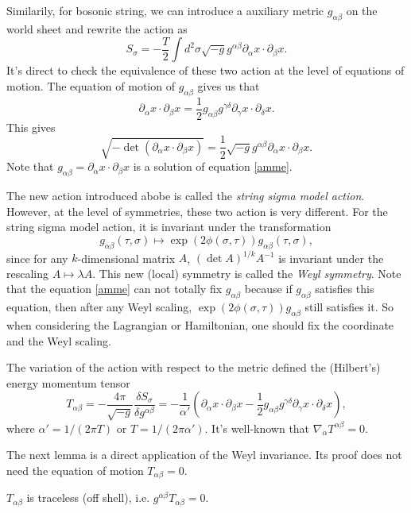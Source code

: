 Similarily, for bosonic string, we can introduce a auxiliary metric 
$g_{\alpha\beta}$ on the world sheet and rewrite the action as
\[
	S_\sigma=-\frac{T}{2} \int d^2\sigma \sqrt{-g}
	g^{\alpha\beta}\partial_\alpha x\cdot \partial_\beta x.
\]
It's direct to check the equivalence of these two action
at the level of equations of motion. The equation of motion of
$g_{\alpha\beta}$ gives us that
\begin{equation}\label{amme}
	\partial_\alpha x\cdot \partial_\beta x
	=\frac{1}{2}g_{\alpha\beta}g^{\gamma\delta}
	\partial_\gamma x\cdot \partial_\delta x.
\end{equation}
This gives
\[
	\sqrt{-\det(\partial_\alpha x\cdot \partial_\beta x)}
	=\frac{1}{2}\sqrt{-g}g^{\alpha\beta}
	\partial_\alpha x\cdot \partial_\beta x.
\]
Note that $g_{\alpha\beta}=\partial_\alpha x\cdot \partial_\beta x$
is a solution of equation \eqref{amme}.

The new action introduced abobe is called 
the \textit{string sigma model action}. However,
at the level of symmetries, these two action is very different.
For the string sigma model action, it is invariant under the 
transformation 
\[
	g_{\alpha\beta}(\tau,\sigma)\longmapsto
	\exp(2\phi(\sigma,\tau))g_{\alpha\beta}(\tau,\sigma),
\]
since for any $k$-dimensional matrix $A$, 
$(\det A)^{1/k} A^{-1}$ is invariant under the rescaling 
$A\mapsto \lambda A$. This new (local) symmetry is called 
the \textit{Weyl symmetry}. Note that the equation 
\eqref{amme} can not totally fix $g_{\alpha\beta}$ because
if $g_{\alpha\beta}$ satisfies this equation, then after
any Weyl scaling, $\exp(2\phi(\sigma,\tau))g_{\alpha\beta}$
still satisfies it. So when considering the Lagrangian or
Hamiltonian, one should fix the coordinate and the Weyl
scaling.

The variation of the action with respect to the metric
defined the (Hilbert's) energy momentum tensor
\[
	T_{\alpha\beta}=-\frac{4\pi}{\sqrt{-g}}
	\frac{\delta S_\sigma}{\delta g^{\alpha\beta}}=
	-\frac{1}{\alpha'}\left(
	\partial_\alpha x\cdot \partial_\beta x-
	\frac 12 g_{\alpha\beta}g^{\gamma\delta}
	\partial_\gamma x\cdot \partial_\delta x
	\right),
\]
where $\alpha'=1/(2\pi T)$ or $T=1/(2\pi \alpha')$. 
It's well-known that $\nabla_\alpha T^{\alpha \beta}=0$.

The next lemma is a direct application of the Weyl invariance.
Its proof does not need the equation of motion $T_{\alpha\beta}=0$.

\begin{lem}
	$T_{\alpha\beta}$ is traceless (off shell), i.e. $g^{\alpha\beta}T_{\alpha\beta}=0$.
\end{lem}

